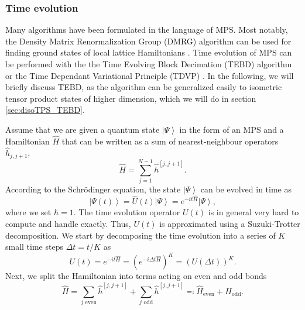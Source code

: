 \subsubsection*{\hfil\quad\quad\quad\quad\quad\quad\quad Time evolution}
Many algorithms have been formulated in the language of MPS. Most notably, the Density Matrix Renormalization Group (DMRG) algorithm can be used for finding ground states of local lattice Hamiltonians \cite{cite:DMRG_in_the_age_of_MPS}. Time evolution of MPS can be performed with the the Time Evolving Block Decimation (TEBD) algorithm \cite{cite:efficient_simulation_of_1D_quantum_many_body_systems, cite:matrix_product_density_operators_simulation_of_finite_temperature_and_dissipative_systems} or the Time Dependant Variational Principle (TDVP) \cite{cite:time_dependent_variational_principle_for_quantum_lattices, cite:unifying_time_evolution_and_optimization_with_MPS}. In the following, we will briefly discuss TEBD, as the algorithm can be generalized easily to isometric tensor product states of higher dimension, which we will do in section \ref{sec:disoTPS_TEBD}. \par
Assume that we are given a quantum state $\left|\Psi\right\rangle$ in the form of an MPS and a Hamiltonian $\hat{H}$ that can be written as a sum of nearest-neighbour operators $\hat{h}_{j,j+1}$,
\begin{equation}
	\hat{H} = \sum_{j = 1}^{N-1} \hat{h}^{[j,j+1]}.
\end{equation}
According to the Schrödinger equation, the state $\left|\Psi\right\rangle$ can be evolved in time as
\begin{equation}
	\left|\Psi(t)\right\rangle = \hat{U}\left(t\right) \left|\Psi\right\rangle = e^{-it\hat{H}} \left|\Psi\right\rangle,
\end{equation}
where we set $\hbar = 1$. The time evolution operator $U(t)$ is in general very hard to compute and handle exactly. Thus, $U(t)$ is approximated using a Suzuki-Trotter decomposition. We start by decomposing the time evolution into a series of $K$ small time steps $\Delta t = t/K$ as
\begin{equation}
	U(t) = e^{-it\hat{H}} = \left(e^{-i\Delta t\hat{H}}\right)^K = \left(U(\Delta t)\right)^K.
\end{equation}
Next, we split the Hamiltonian into terms acting on even and odd bonds
\begin{equation}
	\hat{H} = \sum_{j \text{ even}}\hat{h}^{[j, j+1]} + \sum_{j \text{ odd}}\hat{h}^{[j, j+1]} \eqqcolon \hat{H}_\text{even} + \hat{H}_\text{odd}.
\end{equation}
